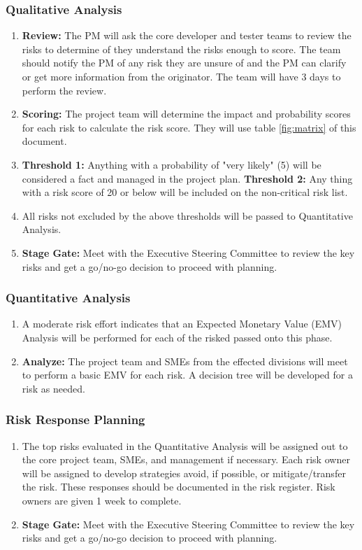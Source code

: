 \documentclass[a4paper, 11pt]{article}
\begin{document}
\subsubsection{Qualitative Analysis}
\begin{enumerate}
	\item \textbf{Review:} The PM will ask the core developer and tester teams to review the risks to determine of they understand the risks enough to score. The team should notify the PM of any risk they are unsure of and the PM can clarify or get more information from the originator. The team will have 3 days to perform the review.
	\item \textbf{Scoring:} The project team will determine the
	impact and probability scores for each risk to calculate the risk score. They will use table \ref{fig:matrix} of this document.
	\item \textbf{Threshold 1:} Anything with a probability of "very likely" (5) will be considered a fact and managed in the project plan. \textbf{Threshold 2:} Any thing with a risk score of 20 or below will be included on the non-critical risk list.
	\item All risks not excluded by the above thresholds will be passed to Quantitative Analysis.
	\item \textbf{Stage Gate:} Meet with the Executive Steering 	Committee to review the key risks and get a	go/no-go decision to proceed with planning.
\end{enumerate}

\subsubsection{Quantitative Analysis}
\begin{enumerate}
	\item A moderate risk effort indicates that an Expected Monetary Value (EMV) Analysis will be performed for each of the risked passed onto this phase.
	\item \textbf{Analyze:} The project team and SMEs from the effected divisions will meet to perform a basic EMV for each risk. A decision tree will be developed for a risk as needed.
\end{enumerate}

\subsubsection{Risk Response Planning}
\begin{enumerate}
	\item The top risks evaluated in the Quantitative Analysis will be assigned out to the core project team, SMEs, and management if
	necessary. Each risk owner will be assigned to develop strategies avoid, if possible, or mitigate/transfer the risk. These responses
	should be documented in the risk register. Risk owners are given 1 week to complete.
	\item \textbf{Stage Gate:} Meet with the Executive Steering 	Committee to review the key risks and get a	go/no-go decision to proceed with planning.
\end{enumerate}
\end{document}

